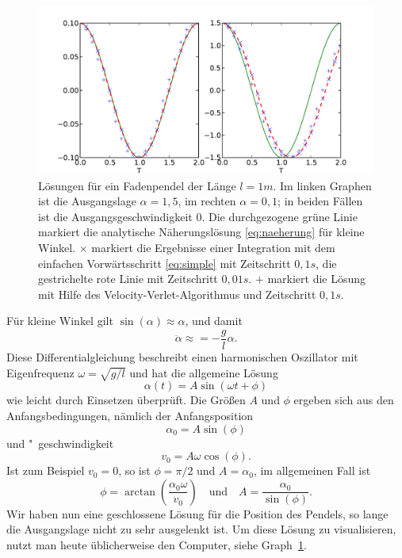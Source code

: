 \begin{figure}
  \centering
  \includegraphics[width=\textwidth]{plots/pendel_loesung}
  \caption{Lösungen für ein Fadenpendel der Länge $l=1m$. Im linken Graphen
    ist die Ausgangslage $\alpha=1,5$, im rechten $\alpha=0,1$; in
    beiden Fällen ist die Ausgangsgeschwindigkeit 0. Die durchgezogene
  grüne Linie markiert die analytische Näherungslösung
  \eqref{eq:naeherung} für kleine Winkel. $\times$ markiert die
  Ergebnisse einer Integration mit dem einfachen Vorwärtsschritt
  \eqref{eq:simple} mit Zeitschritt $0,1s$, die gestrichelte rote
  Linie mit Zeitschritt $0,01s$. $+$ markiert die Lösung mit Hilfe des
  Velocity-Verlet-Algorithmus und Zeitschritt $0,1s$.}
  \label{fig:loesung}
\end{figure}

Für kleine Winkel gilt $\sin(\alpha)\approx\alpha$, und damit
\begin{equation}
  \label{eq:harmosz}
  \ddot\alpha \approx = -\frac{g}{l}\alpha.
\end{equation}
Diese Differentialgleichung beschreibt einen harmonischen Oszillator
mit Eigenfrequenz $\omega=\sqrt{g/l}$ und hat die allgemeine Lösung
\begin{equation}
  \alpha(t) = A \sin(\omega t + \phi)
  \label{eq:naeherung}
\end{equation}
wie leicht durch Einsetzen überprüft. Die Größen $A$ und $\phi$
ergeben sich aus den Anfangsbedingungen, nämlich der Anfangsposition
\begin{equation}
  \alpha_0 = A \sin(\phi)
\end{equation}
und "~geschwindigkeit
\begin{equation}
  v_0 = A \omega \cos(\phi).
\end{equation}
Ist zum Beispiel $v_0=0$, so ist $\phi=\pi/2$ und $A=\alpha_0$, im
allgemeinen Fall ist
\begin{equation}
\phi =
\arctan\left(\frac{\alpha_0\omega}{v_0}\right)\quad\text{und}\quad
A = \frac{\alpha_0}{\sin(\phi)}.
\end{equation}
Wir haben nun eine geschlossene Lösung für die Position des Pendels,
so lange die Ausgangslage nicht zu sehr ausgelenkt ist. Um diese
Lösung zu visualisieren, nutzt man heute üblicherweise den Computer,
siehe Graph~\ref{fig:loesung}.

